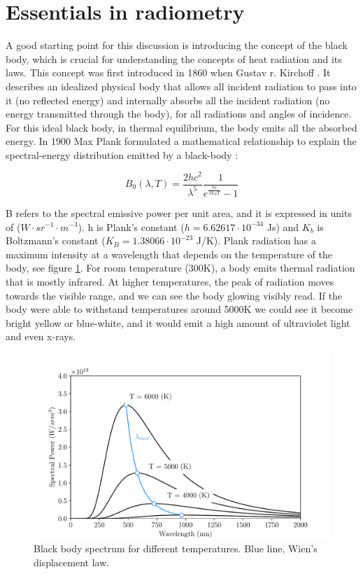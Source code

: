 \section{Essentials in radiometry}

A good starting point for this discussion is introducing the concept of the black body, which is crucial for understanding the concepts of heat radiation and its laws. This concept was first introduced in 1860 when Gustav r. Kirchoff \parencite[][]{ref:Kirchoff}. It describes an idealized physical body that allows all incident radiation to pass into it (no reflected energy) and internally absorbs all the incident radiation (no energy transmitted through the body), for all radiations and angles of incidence. For this ideal black body, in thermal equilibrium, the body emits all the absorbed energy. In 1900 Max Plank formulated a mathematical relationship to explain the spectral-energy distribution emitted by a black-body \parencite[][]{ref:Planck}:

\begin{equation}
    B_{0}\left(\lambda,T\right) = \frac{2hc^2}{\lambda^5}\frac{1}{e^{\frac{hc}{\lambda k_B T}}-1}
    \label{eq:plank}
\end{equation}

B refers to the spectral emissive power per unit area, and it is expressed in units of ($W\cdot sr^{-1} \cdot m^{-3}$). h is Plank's constant ($h = 6.62617\cdot 10^{-34}$ Js) and $K_b$ is Boltzmann's constant ($K_{B} = 1.38066\cdot 10^{-23}$ J/K). Plank radiation has a maximum intensity at a wavelength that depends on the temperature of the body, see figure \ref{fig:MaxWavelenght}. For room temperature (300K), a body emits thermal radiation that is mostly infrared. At higher temperatures, the peak of radiation moves towards the visible range, and we can see the body glowing visibly read. If the body were able to withstand temperatures around 5000K we could see it become bright yellow or blue-white, and it would emit a high amount of ultraviolet light and even x-rays. 

\begin{figure}[h]
    \centering
    \includegraphics[width=0.80\columnwidth]{PlankEquation/PlankEq.pdf}
    \caption{Black body spectrum for different temperatures. Blue line, Wien's displacement law.}
    \label{fig:MaxWavelenght}
\end{figure}

